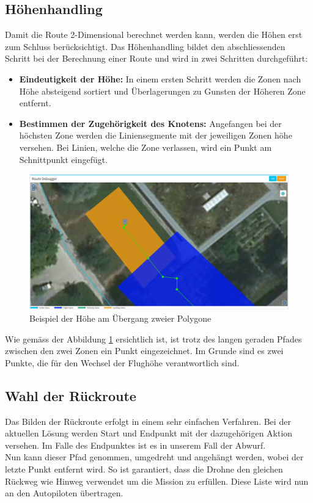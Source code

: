 \subsection{Höhenhandling}
Damit die Route 2-Dimensional berechnet werden kann, werden die Höhen erst zum Schluss berücksichtigt. Das Höhenhandling bildet den abschliessenden Schritt bei der Berechnung einer Route und wird in zwei Schritten durchgeführt:

\begin{itemize}
	\item{\textbf{Eindeutigkeit der Höhe:} In einem ersten Schritt werden die Zonen nach Höhe absteigend sortiert und Überlagerungen zu Gunsten der Höheren Zone entfernt.}
	\item{\textbf{Bestimmen der Zugehörigkeit des Knotens:} Angefangen bei der höchsten Zone werden die Liniensegmente mit der jeweiligen Zonen höhe versehen. Bei Linien, welche die Zone verlassen, wird ein Punkt am Schnittpunkt eingefügt.}
\end{itemize}
\begin{figure}[h]
	\centering
	\includegraphics[width=1.0\textwidth]{images/routing/height_example.png}
	\caption{Beispiel der Höhe am Übergang zweier Polygone}
	\label{fig:polygon-border-example}
\end{figure}
Wie gemäss der Abbildung \ref{fig:polygon-border-example} ersichtlich ist, ist trotz des langen geraden Pfades zwischen den zwei Zonen ein Punkt eingezeichnet. Im Grunde sind es zwei Punkte, die für den Wechsel der Flughöhe verantwortlich sind.
\newpage
\subsection{Wahl der Rückroute}
Das Bilden der Rückroute erfolgt in einem sehr einfachen Verfahren. Bei der aktuellen Lösung werden Start und Endpunkt mit der dazugehörigen Aktion versehen. Im Falle des Endpunktes ist es in unserem Fall der Abwurf.
\\
Nun kann dieser Pfad genommen, umgedreht und angehängt werden, wobei der letzte Punkt entfernt wird. So ist garantiert, dass die Drohne den gleichen Rückweg wie Hinweg verwendet um die Mission zu erfüllen. Diese Liste wird nun an den Autopiloten übertragen.
